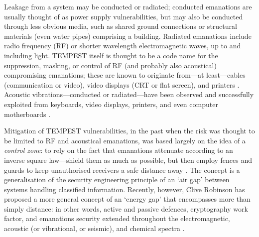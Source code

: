 \documentclass[a4paper,twoside,11pt,openany]{book}
\begin{document}
Leakage from a system may be conducted or radiated; conducted emanations are
usually thought of as power supply vulnerabilities, but may also be conducted
through less obvious media, such as shared ground connections or structural
materials (even water pipes)
comprising a building. Radiated emanations include radio frequency (RF) or
shorter wavelength electromagnetic waves, up to and including light. TEMPEST
itself is
thought to be a code name for the suppression, masking, or control of RF (and
probably also acoustical)
compromising emanations; these are known to originate from---at least---cables
(communication or video), video displays (CRT or flat screen), and printers
\cite{NSAtempest2007,vanEck1985,Smulders1990,Kuhn2002,Grzesiak2010a}. Acoustic
vibrations---conducted or radiated---have been observed and successfully
exploited from keyboards, video displays, printers, and even computer
motherboards \cite{Wright1987,Asonov2004,Zhuang2005,Berger2006,Backes2010,
Genkin2013,Genkin2018a,Kubiak2018f}.

Mitigation of TEMPEST vulnerabilities, in the past when the risk was thought to
be limited to RF and acoustical emanations, was based largely on the idea of a
\emph{control zone}: to rely on the fact that emanations attenuate according to
an inverse square law---shield them as much as possible, but then employ fences
and guards to keep unauthorised receivers a safe distance away \cite[\S
17.4.2]{Anderson2008a}. The concept is a generalisation of the security
engineering principle of an `air gap' between systems handling classified
information. Recently, however, Clive Robinson has proposed a more general
concept of an `energy gap' that encompasses more than simply distance: in other
words, active and passive defences, cryptography work factor, and emanations
security extended throughout the electromagnetic, acoustic (or vibrational, or
seismic), and chemical spectra \cite{Robinson2018a,Robinson2018b}.
\end{document}
